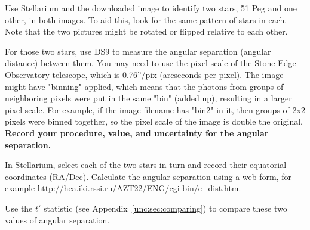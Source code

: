 \begin{steps}
	\item Use Stellarium and the downloaded image to identify two stars, 51 Peg and one other, in both images. To aid this, look for the same pattern of stars in each. Note that the two pictures might be rotated or flipped relative to each other.

	\item For those two stars, use DS9 to measure the angular separation (angular distance) between them. You may need to use the pixel scale of the Stone Edge Observatory telescope, which is 0.76''/pix (arcseconds per pixel). The image might have "binning" applied, which means that the photons from groups of neighboring pixels were put in the same "bin" (added up), resulting in a larger pixel scale. For example, if the image filename has "bin2" in it, then groups of 2x2 pixels were binned together, so the pixel scale of the image is double the original. \textbf{Record your procedure, value, and uncertainty for the angular separation.}

	\item In Stellarium, select each of the two stars in turn and record their equatorial coordinates (RA/Dec). Calculate the angular separation using a web form, for example \url{http://hea.iki.rssi.ru/AZT22/ENG/cgi-bin/c_dist.htm}.

	\item Use the $t'$ statistic (see Appendix\ \ref{unc:sec:comparing}) to compare these two values of angular separation.


\end{steps}



